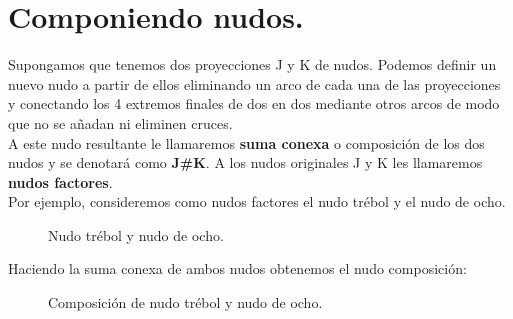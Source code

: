 \section{Componiendo nudos.}\label{seccion3}
Supongamos que tenemos dos proyecciones J y K de nudos. Podemos definir un nuevo nudo a partir de ellos eliminando un arco de cada una de las proyecciones y conectando los 4 extremos finales de dos en dos mediante otros arcos de modo que no se añadan ni eliminen cruces.\\
A este nudo resultante le llamaremos \textbf{suma conexa} o composición de los dos nudos y se denotará como \textbf{J\#K}. A los nudos originales J y K les llamaremos \textbf{nudos factores}. \\

Por ejemplo, consideremos como nudos factores el nudo trébol y el nudo de ocho. 
\begin{figure}[h!]
	\centering
	\caption{Nudo trébol y nudo de ocho.}
	\label{comp1} 
\end{figure}

Haciendo la suma conexa de ambos nudos obtenemos el nudo composición:
\begin{figure}[h!]
	\centering
	\caption{Composición de nudo trébol y nudo de ocho.}
	\label{comp2} 
\end{figure}


